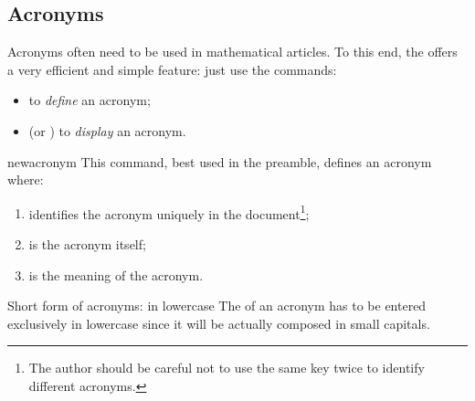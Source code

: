 \documentclass[english,nolocaltoc]{nwejmart}
\newtheorem[style=definition]{fact}
\newtheorem[title-plural=Criteria]{criterion}
\newtheorem[title=random experiment]{rexp}
\begin{document}
%

\subsection{Acronyms}
\label{sec:acronymes}

Acronyms often need to be used in mathematical articles. To this end,
the   offers a very efficient and simple feature:
just use the commands:
\begin{itemize}
\item {} to \emph{define} an acronym;
\item {} (or ) to \emph{display} an acronym.
\end{itemize}

\begin{docCommand}{newacronym}{}
  This command, best used in the preamble,  defines an acronym where:
  \begin{enumerate}
  \item {} identifies the acronym uniquely in the 
    document\footnote{The author should be careful not to use the same
      key twice  to identify different acronyms.};
  \item {} is  the acronym itself;
  \item {} is the meaning of the acronym.
  \end{enumerate}
\begin{dbwarning}{Short form of acronyms: in lowercase}{}
  The  of an acronym has to be entered exclusively
  in lowercase since it will be actually composed in small capitals.
\end{dbwarning}
\end{docCommand}
\end{document}
